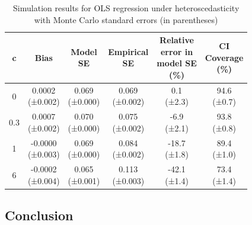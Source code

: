 \documentclass[
  twocolumn]{article}
\begin{document}
\begin{table}[H]
\centering
\caption{\label{tab:unnamed-chunk-4}Simulation results for OLS regression under heteroscedasticity with Monte Carlo standard errors (in parentheses)}
\centering
\fontsize{9}{11}\selectfont
\begin{tabular}[t]{cccccc}
\toprule
c & Bias & \makecell{Model\\SE} & \makecell{Empirical\\SE} & \makecell{Relative\\error in\\model SE\\(\%)} & \makecell{CI\\Coverage\\(\%)}\\
\midrule
0 & \makecell{0.0002 \\ (±0.002)} & \makecell{0.069 \\ (±0.000)} & \makecell{0.069 \\ (±0.002)} & \makecell{0.1 \\ (±2.3)} & \makecell{94.6 \\ (±0.7)}\\
0.3 & \makecell{0.0007 \\ (±0.002)} & \makecell{0.070 \\ (±0.000)} & \makecell{0.075 \\ (±0.002)} & \makecell{-6.9 \\ (±2.1)} & \makecell{93.8 \\ (±0.8)}\\
1 & \makecell{-0.0000 \\ (±0.003)} & \makecell{0.069 \\ (±0.000)} & \makecell{0.084 \\ (±0.002)} & \makecell{-18.7 \\ (±1.8)} & \makecell{89.4 \\ (±1.0)}\\
6 & \makecell{-0.0002 \\ (±0.004)} & \makecell{0.065 \\ (±0.001)} & \makecell{0.113 \\ (±0.003)} & \makecell{-42.1 \\ (±1.4)} & \makecell{73.4 \\ (±1.4)}\\
\bottomrule
\end{tabular}
\end{table}

\subsection{Conclusion}\label{conclusion}
\end{document}
